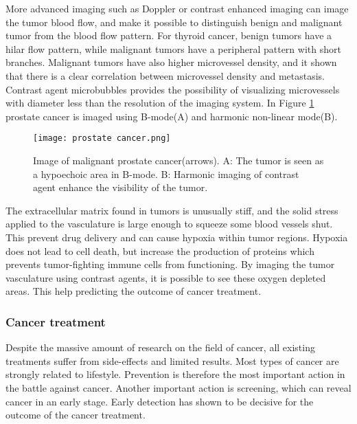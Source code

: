 More advanced imaging such as Doppler or contrast enhanced imaging can image the tumor blood flow, and make it possible to distinguish benign and malignant tumor from the blood flow pattern. For thyroid cancer, benign tumors have a hilar flow pattern, while malignant tumors have a peripheral pattern with short branches\cite{Go2003}. Malignant tumors have also higher microvessel density, and it shown that there is a clear correlation between microvessel density and metastasis\cite{Rifkin1990}. Contrast agent microbubbles provides the possibility of visualizing microvessels with diameter less than the resolution of the imaging system. In Figure \ref{Fig:prostate cancer} prostate cancer is imaged using B-mode(A) and harmonic non-linear mode(B).

\begin{figure}[h]
  \centering
  \label{Fig:prostate cancer}
  \texttt{[image: prostate cancer.png]}
  \caption{Image of malignant prostate cancer(arrows)\cite{Halpern2006}. A: The tumor is seen as a hypoechoic area in B-mode. B: Harmonic imaging of contrast agent enhance the visibility of the tumor.}
\end{figure}

The extracellular matrix found in tumors is unusually stiff, and the solid stress applied to the vasculature is large enough to  squeeze some blood vessels shut. This prevent drug delivery and can cause hypoxia within tumor regions. Hypoxia does not lead to cell death, but increase the production of proteins which prevents tumor-fighting immune cells from functioning\cite{Jain2014}. By imaging the tumor vasculature using contrast agents, it is possible to see these oxygen depleted areas. This help predicting the outcome of cancer treatment. 


\subsubsection{Cancer treatment}
Despite the massive amount of research on the field of cancer, all existing treatments suffer from side-effects and limited results. Most types of cancer are strongly related to lifestyle. Prevention is therefore the most important action in the battle against cancer. Another important action is screening, which can reveal cancer in an early stage. Early detection has shown to be decisive for the outcome of the cancer treatment\cite{king2006cancer}\cite{Jordan1986}.

